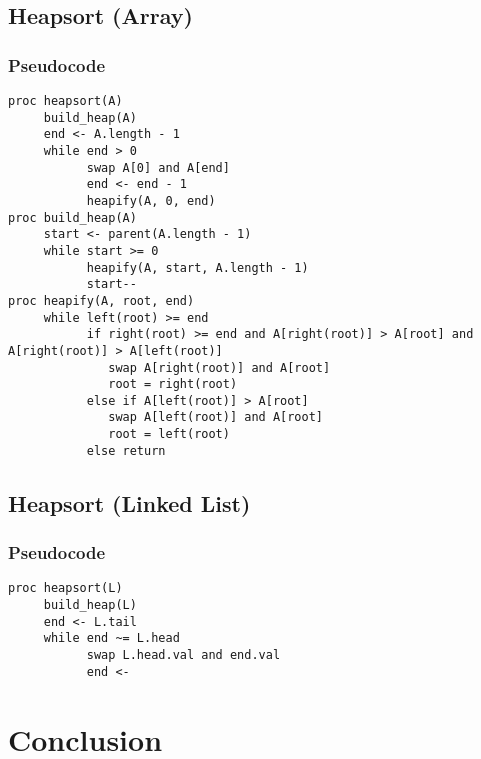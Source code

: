 \documentclass[a4paper,12pt]{article}
\begin{document}
\subsection{Heapsort (Array)}
\subsubsection{Pseudocode}
\begin{verbatim}
proc heapsort(A)
     build_heap(A)
     end <- A.length - 1
     while end > 0
           swap A[0] and A[end]
           end <- end - 1
           heapify(A, 0, end)
proc build_heap(A)
     start <- parent(A.length - 1)
     while start >= 0
           heapify(A, start, A.length - 1)
           start--
proc heapify(A, root, end)
     while left(root) >= end
           if right(root) >= end and A[right(root)] > A[root] and A[right(root)] > A[left(root)]
              swap A[right(root)] and A[root]
              root = right(root)
           else if A[left(root)] > A[root]
              swap A[left(root)] and A[root]
              root = left(root)
           else return
\end{verbatim}
\subsection{Heapsort (Linked List)}
\subsubsection{Pseudocode}
\begin{verbatim}
proc heapsort(L)
     build_heap(L)
     end <- L.tail
     while end ~= L.head
           swap L.head.val and end.val
           end <- 
\end{verbatim}
\section{Conclusion}
\end{document}
